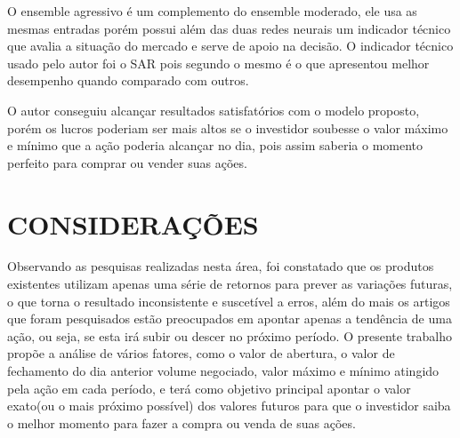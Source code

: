 O ensemble agressivo é um complemento do ensemble moderado, ele usa as mesmas entradas porém possui além das duas redes neurais um indicador técnico que avalia a situação do mercado e serve de apoio na decisão. O indicador técnico usado pelo autor foi o SAR pois segundo o mesmo é o que apresentou melhor desempenho quando comparado com outros.

O autor conseguiu alcançar resultados satisfatórios com o modelo proposto, porém os lucros poderiam ser mais altos se o investidor soubesse o valor máximo e mínimo que a ação poderia alcançar no dia, pois assim saberia o momento perfeito para comprar ou vender suas ações.

\section{CONSIDERAÇÕES}
Observando as pesquisas realizadas nesta área, foi constatado que os produtos existentes utilizam apenas uma série de retornos para prever as variações futuras, o que torna o resultado inconsistente e suscetível a erros, além do mais os artigos que foram pesquisados estão preocupados em apontar apenas a tendência de uma ação, ou seja, se esta irá subir ou descer no próximo período. O presente trabalho propõe a análise de vários fatores, como o valor de abertura, o valor de fechamento do dia anterior volume negociado, valor máximo e mínimo atingido pela ação em cada período, e terá como objetivo principal apontar o valor exato(ou o mais próximo possível) dos valores futuros para que o investidor saiba o melhor momento para fazer a compra ou venda de suas ações.
